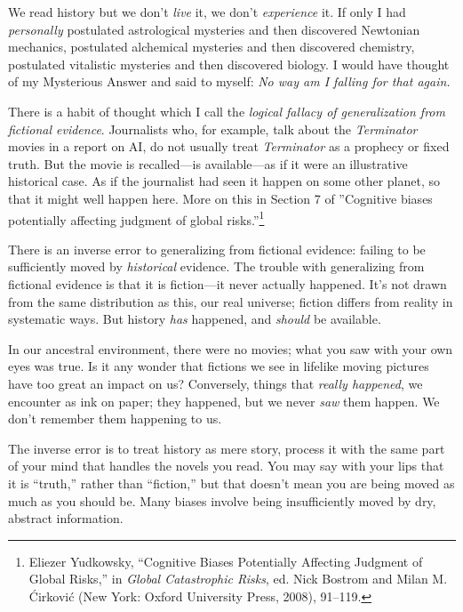 {
 We read history but we don't \textit{live} it, we
don't \textit{experience} it. If only I had
\textit{personally} postulated astrological mysteries and then
discovered Newtonian mechanics, postulated alchemical mysteries and
then discovered chemistry, postulated vitalistic mysteries and then
discovered biology. I would have thought of my Mysterious Answer and
said to myself: \textit{No way am I falling for that again.}}

\myendsectiontext


{
 There is a habit of thought which I call the \textit{logical
fallacy of generalization from fictional evidence}. Journalists who,
for example, talk about the \textit{Terminator} movies in a report on
AI, do not usually treat \textit{Terminator} as a prophecy or fixed
truth. But the movie is recalled---is available{}---as if it were an
illustrative historical case. As if the journalist had seen it happen
on some other planet, so that it might well happen here. More on this
in Section 7 of ''Cognitive biases potentially
affecting judgment of global
risks.''\footnote{Eliezer Yudkowsky, ``Cognitive Biases
Potentially Affecting Judgment of Global Risks,'' in
\textit{Global Catastrophic Risks}, ed. Nick Bostrom and Milan M.
\'Cirkovi\'c (New York: Oxford University Press, 2008), 91--119.} }

{
 There is an inverse error to generalizing from fictional evidence:
failing to be sufficiently moved by \textit{historical} evidence. The
trouble with generalizing from fictional evidence is that it is
fiction---it never actually happened. It's not drawn
from the same distribution as this, our real universe; fiction differs
from reality in systematic ways. But history \textit{has} happened, and
\textit{should} be available.}

{
 In our ancestral environment, there were no movies; what you saw
with your own eyes was true. Is it any wonder that fictions we see in
lifelike moving pictures have too great an impact on us? Conversely,
things that \textit{really happened}, we encounter as ink on paper;
they happened, but we never \textit{saw} them happen. We
don't remember them happening to us.}

{
 The inverse error is to treat history as mere story, process it
with the same part of your mind that handles the novels you read. You
may say with your lips that it is
``truth,'' rather than
``fiction,'' but that
doesn't mean you are being moved as much as you should
be. Many biases involve being insufficiently moved by dry, abstract
information.}

